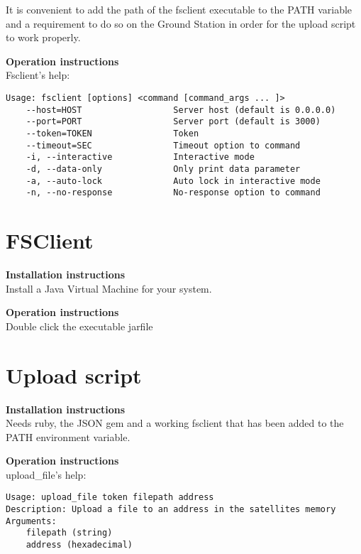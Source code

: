 It is convenient to add the path of the fsclient executable to the PATH variable and a requirement to do so on the Ground Station in order for the upload script to work properly.

\textbf{Operation instructions} \\
Fsclient's help:
\begin{verbatim}
Usage: fsclient [options] <command [command_args ... ]>
    --host=HOST                  Server host (default is 0.0.0.0)
    --port=PORT                  Server port (default is 3000)
    --token=TOKEN                Token
    --timeout=SEC                Timeout option to command
    -i, --interactive            Interactive mode
    -d, --data-only              Only print data parameter
    -a, --auto-lock              Auto lock in interactive mode
    -n, --no-response            No-response option to command

\end{verbatim}

\section{FSClient}
\textbf{Installation instructions} \\
Install a Java Virtual Machine for your system.

\textbf{Operation instructions} \\
Double click the executable jarfile

\section{Upload script}
\textbf{Installation instructions} \\
Needs ruby, the JSON gem and a working fsclient that has been added to the PATH environment variable.

\textbf{Operation instructions} \\
upload\_file's help:
\begin{verbatim}
Usage: upload_file token filepath address
Description: Upload a file to an address in the satellites memory
Arguments:
    filepath (string)
    address (hexadecimal)
\end{verbatim}
